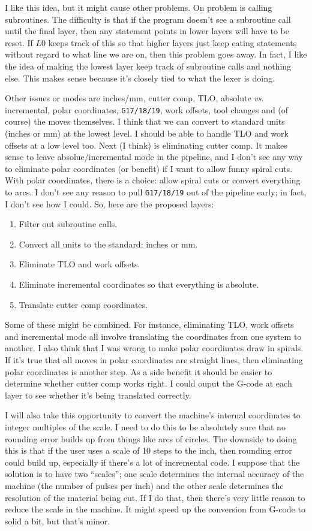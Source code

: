 \documentclass[titlepage,oneside,10pt]{article}
\begin{document}
I like this idea, but it might cause other problems. On problem is
calling subroutines. The difficulty is that if the program doesn't see
a subroutine call until the final layer, then any statement points in
lower layers will have to be reset. If $L0$ keeps track of this so
that higher layers just keep eating statements without regard to what
line we are on, then this problem goes away. In fact, I like the idea
of making the lowest layer keep track of subroutine calls and nothing
else. This makes sense because it's closely tied to what the lexer is
doing. 

Other issues or modes are inches/mm, cutter comp, TLO,
absolute \emph{vs}. incremental, polar coordinates, {\tt G17/18/19}, work
offsets, tool changes and (of course) the moves themselves. I think
that we can convert to standard units (inches or mm) at the lowest
level. I should be able to handle TLO and work offsets at a low
level too. Next (I think) is eliminating cutter comp. It makes sense
to leave absolue/incremental mode in the pipeline, and I don't see any
way to eliminate polar coordinates (or benefit) if I want to allow
funny spiral cuts. With polar coordinates, there is a choice: allow
spiral cuts or convert everything to arcs. I don't see any reason to
pull {\tt G17/18/19} out of the pipeline early; in fact, I don't see
how I could. So, here are the proposed layers:
\begin{enumerate}
\setlength{\itemsep}{0mm}
\item Filter out subroutine calls.
\item Convert all units to the standard: inches or mm.
\item Eliminate TLO and work offsets.
\item Eliminate incremental coordinates so that everything is absolute.
\item Translate cutter comp coordinates.
\end{enumerate}
Some of these might be combined. For instance, eliminating TLO, work
offsets and incremental mode all involve translating the coordinates
from one system to another. I also think that I was wrong to make
polar coordinates draw in spirals. If it's true that all moves
in polar coordinates are straight lines, then eliminating polar
coordinates is another step. As a side benefit it should be easier to
determine whether cutter comp works right. I could ouput the G-code at
each layer to see whether it's being translated correctly.

I will also take this opportunity to convert the machine's internal
coordinates to integer multiples of the scale. I need to do this to be
absolutely sure that no rounding error builds up from things like arcs
of circles. The downside to doing this is that if the user uses a
scale of 10 steps to the inch, then rounding error could build up,
especially if there's a lot of incremental code. I suppose that the
solution is to have two ``scales''; one scale determines the internal
accuracy of the machine (the number of pulses per inch) and the other
scale determines the resolution of the material being cut. If I do
that, then there's very little reason to reduce the scale in the
machine. It might speed up the conversion from G-code to solid a bit,
but that's minor.
\end{document}
